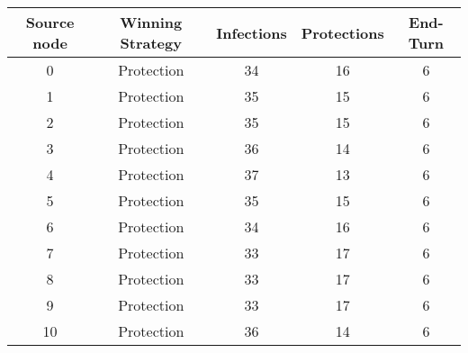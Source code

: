 \documentclass[results.tex]{subfiles}
\begin{document}
    \begin{center}
        \begin{tabular}{| c || c | c | c | c |}
            \hline
            {\bfseries Source node} & {\bfseries Winning Strategy} & {\bfseries Infections} & {\bfseries Protections}
            & {\bfseries End-Turn}
            \\  %
            \hline\hline
            0                       & Protection                   & 34                     & 16                      & 6                    \\
            \hline
            1                       & Protection                   & 35                     & 15                      & 6                    \\
            \hline
            2                       & Protection                   & 35                     & 15                      & 6                    \\
            \hline
            3                       & Protection                   & 36                     & 14                      & 6                    \\
            \hline
            4                       & Protection                   & 37                     & 13                      & 6                    \\
            \hline
            5                       & Protection                   & 35                     & 15                      & 6                    \\
            \hline
            6                       & Protection                   & 34                     & 16                      & 6                    \\
            \hline
            7                       & Protection                   & 33                     & 17                      & 6                    \\
            \hline
            8                       & Protection                   & 33                     & 17                      & 6                    \\
            \hline
            9                       & Protection                   & 33                     & 17                      & 6                    \\
            \hline
            10                      & Protection                   & 36                     & 14                      & 6                    \\

\end{tabular}
\end{center}
\end{document}
